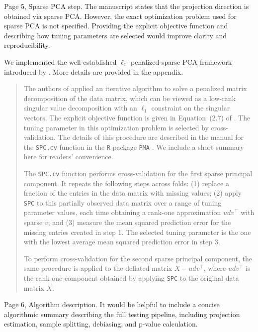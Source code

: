 \documentclass{article}
\theoremstyle{definition}
\begin{document}
\begin{shaded}
Page 5, Sparse PCA step.
The manuscript states that the projection direction is obtained via sparse PCA. However, the exact optimization problem used for sparse PCA is not specified. Providing the explicit objective function and describing how tuning parameters are selected would improve clarity and reproducibility.
\end{shaded}

We implemented the well-established $\ell_1$-penalized sparse PCA framework introduced by \cite{witten2009penalized}. More details are provided in the appendix. 

\begin{quote}
The authors of \cite{witten2009penalized} applied an iterative algorithm to solve a penalized matrix decomposition of the data matrix, which can be viewed as a low-rank singular value decomposition with an $\ell_1$ constraint on the singular vectors. The explicit objective function is given in Equation~(2.7) of \cite{witten2009penalized}. The tuning parameter in this optimization problem is selected by cross-validation. The details of this procedure are described in the manual for the \texttt{SPC.cv} function in the \texttt{R} package \texttt{PMA} \cite{PMA}. We include a short summary here for readers' convenience.

The \texttt{SPC.cv} function performs cross-validation for the first sparse principal component. It repeats the following steps across folds: (1) replace a fraction of the entries in the data matrix with missing values; (2) apply \texttt{SPC} to this partially observed data matrix over a range of tuning parameter values, each time obtaining a rank-one approximation $udv^\top$ with sparse $v$; and (3) measure the mean squared prediction error for the missing entries created in step 1. The selected tuning parameter is the one with the lowest average mean squared prediction error in step 3.

To perform cross-validation for the second sparse principal component, the same procedure is applied to the deflated matrix $X-udv^\top$, where $udv^\top$ is the rank-one component obtained by applying \texttt{SPC} to the original data matrix $X$.
\end{quote}

\begin{shaded}
Page 6, Algorithm description.
It would be helpful to include a concise algorithmic summary describing the full testing pipeline, including projection estimation, sample splitting, debiasing, and p-value calculation.
\end{shaded}
\end{document}

